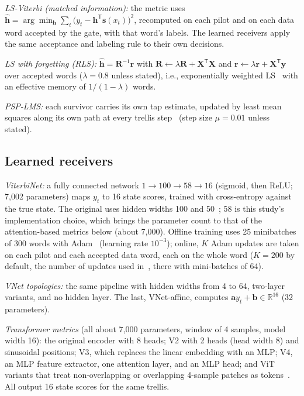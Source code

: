 \documentclass[journal]{IEEEtran}
\begin{document}
\emph{LS-Viterbi (matched information):} the metric uses $\hat{\mathbf h}=\arg\min_{\mathbf h}\sum_t\big(y_t-\mathbf h^{\mathsf T}\mathbf s(x_t)\big)^2$, recomputed on each pilot and on each data word accepted by the gate, with that word's labels. The learned receivers apply the same acceptance and labeling rule to their own decisions.

\emph{LS with forgetting (RLS):} $\hat{\mathbf h}=\mathbf R^{-1}\mathbf r$ with $\mathbf R\leftarrow\lambda\mathbf R+\mathbf X^{\mathsf T}\mathbf X$ and $\mathbf r\leftarrow\lambda\mathbf r+\mathbf X^{\mathsf T}\mathbf y$ over accepted words ($\lambda=0.8$ unless stated), i.e., exponentially weighted LS~\cite{haykin2014adaptive} with an effective memory of $1/(1-\lambda)$ words.

\emph{PSP-LMS:} each survivor carries its own tap estimate, updated by least mean squares along its own path at every trellis step~\cite{raheli1995psp} (step size $\mu=0.01$ unless stated).

\subsection{Learned receivers}
\emph{ViterbiNet:} a fully connected network $1\to100\to58\to16$ (sigmoid, then ReLU; 7,002 parameters) maps $y_t$ to 16 state scores, trained with cross-entropy against the true state. The original uses hidden widths 100 and 50~\cite{shlezinger2020viterbinet}; 58 is this study's implementation choice, which brings the parameter count to that of the attention-based metrics below (about 7,000). Offline training uses 25 minibatches of 300 words with Adam~\cite{kingma2015adam} (learning rate $10^{-3}$); online, $K$ Adam updates are taken on each pilot and each accepted data word, each on the whole word ($K=200$ by default, the number of updates used in~\cite{raviv2023online}, there with mini-batches of 64).

\emph{VNet topologies:} the same pipeline with hidden widths from 4 to 64, two-layer variants, and no hidden layer. The last, VNet-affine, computes $\mathbf a y_t+\mathbf b\in\mathbb R^{16}$ (32 parameters).

\emph{Transformer metrics} (all about 7,000 parameters, window of 4 samples, model width 16): the original encoder with 8 heads; V2 with 2 heads (head width 8) and sinusoidal positions; V3, which replaces the linear embedding with an MLP; V4, an MLP feature extractor, one attention layer, and an MLP head; and ViT variants that treat non-overlapping or overlapping 4-sample patches as tokens~\cite{vaswani2017attention,dosovitskiy2021vit}. All output 16 state scores for the same trellis.
\end{document}
